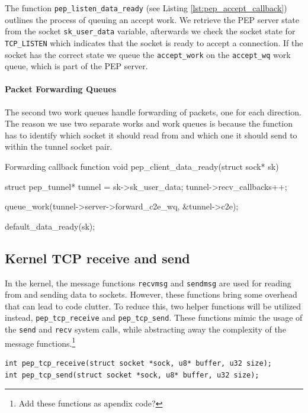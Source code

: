 \documentclass[a4paper,english, 11pt]{report}
\begin{document}
The function \verb|pep_listen_data_ready| (see Listing \ref{lst:pep_accept_callback}) outlines the process of queuing an accept work. We retrieve the PEP server state from the socket \verb|sk_user_data| variable, afterwards we check the socket state for \verb|TCP_LISTEN| which indicates that the socket is ready to accept a connection. If the socket has the correct state we queue the \verb|accept_work| on the \verb|accept_wq| work queue, which is part of the PEP server.

\paragraph{Packet Forwarding Queues}\label{sec:forward_queues}
The second two work queues handle forwarding of packets, one for each direction. The reason we use two separate works and work queues is because the function has to identify which socket it should read from and which one it should send to within the tunnel socket pair. \\

\begin{autonumlstlisting}[label=lst:pep_forward_callback]{Forwarding callback function}
void pep_client_data_ready(struct sock* sk)
{
	struct pep_tunnel* tunnel = sk->sk_user_data;
	tunnel->recv_callbacks++;
        
	queue_work(tunnel->server->forward_c2e_wq, &tunnel->c2e);
        
	default_data_ready(sk);
}
\end{autonumlstlisting}

\subsection{Kernel TCP receive and send}
In the kernel, the message functions \verb|recvmsg| and \verb|sendmsg| are used for reading from and sending data to sockets. However, these functions bring some overhead that can lead to code clutter. To reduce this, two helper functions will be utilized instead, \verb|pep_tcp_receive| and \verb|pep_tcp_send|. These functions mimic the usage of the \verb|send| and \verb|recv| system calls, while abstracting away the complexity of the message functions.\footnote{Add these functions as apendix code?}

\begin{verbatim}
int pep_tcp_receive(struct socket *sock, u8* buffer, u32 size);
int pep_tcp_send(struct socket *sock, u8* buffer, u32 size);
\end{verbatim}
\end{document}
